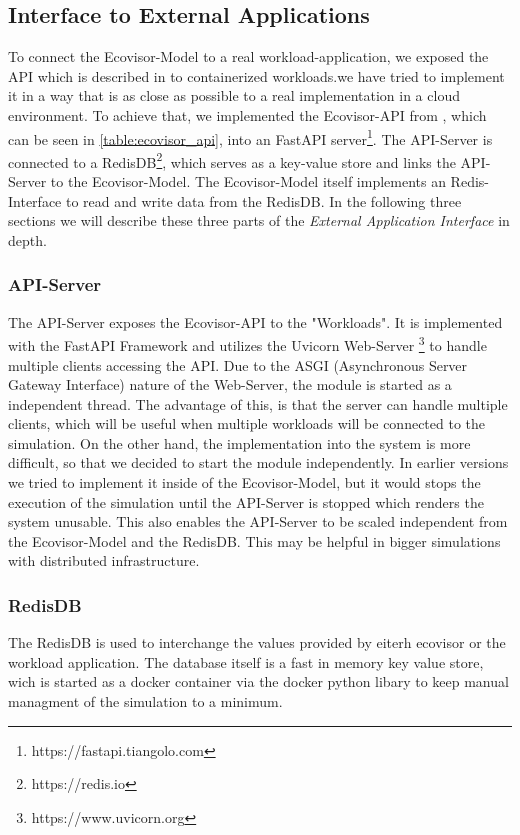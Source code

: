 \subsection{Interface to External Applications}

To connect the Ecovisor-Model to a real workload-application, we exposed the API which is described in \cite{souza2023} to containerized workloads.we have tried to implement it in a way that is as close as possible to a real implementation in a cloud environment.
To achieve that, we implemented the Ecovisor-API from \cite{souza2023}, which can be seen in \ref{table:ecovisor_api}, into an FastAPI server\footnote{https://fastapi.tiangolo.com}. %
The API-Server is connected to a RedisDB\footnote{https://redis.io}, which serves as a key-value store and links the API-Server to the Ecovisor-Model. 
The Ecovisor-Model itself implements an Redis-Interface to read and write data from the RedisDB.
In the following three sections we will describe these three parts of the \textit{External Application Interface} in depth.

\subsubsection{API-Server} %
The API-Server exposes the Ecovisor-API to the "Workloads". It is implemented with the FastAPI Framework and utilizes the Uvicorn Web-Server \footnote{https://www.uvicorn.org} to handle multiple clients accessing the API. Due to the ASGI (Asynchronous Server Gateway Interface) nature of the Web-Server, the module is started as a independent thread. The advantage of this, is that the server can handle multiple clients, which will be useful when multiple workloads will be connected to the simulation. On the other hand, the implementation into the system is more difficult, so that we decided to start the module independently. In earlier versions we tried to implement it inside of the Ecovisor-Model, but it would stops the execution of the simulation until the API-Server is stopped which renders the system unusable. This also enables the API-Server to be scaled independent from the Ecovisor-Model and the RedisDB. This may be helpful in bigger simulations with distributed infrastructure.

\subsubsection{RedisDB}
The RedisDB is used to interchange the values provided by eiterh ecovisor or the workload application. The database itself is a fast in memory key value store, wich is started as a docker container via the docker python libary %
to keep manual managment of the simulation to a minimum.

